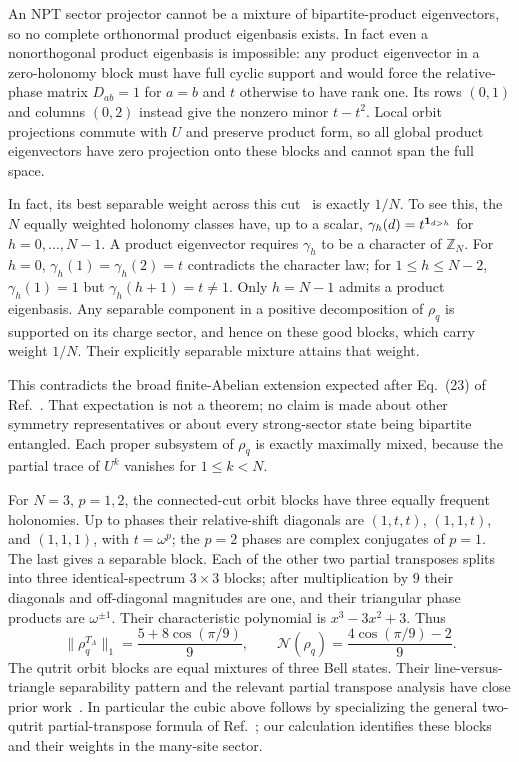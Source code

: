 \documentclass[aps,prl,reprint,nofootinbib]{revtex4-2}
\begin{document}
An NPT sector projector cannot be a mixture of bipartite-product
eigenvectors, so no complete orthonormal product eigenbasis exists. In
fact even a nonorthogonal product eigenbasis is impossible: any product
eigenvector in a zero-holonomy block must have full cyclic support and
would force the relative-phase matrix $D_{ab}=1$ for $a=b$ and $t$
otherwise to have rank one. Its rows $(0,1)$ and columns $(0,2)$ instead
give the nonzero minor $t-t^2$. Local orbit projections commute with $U$
and preserve product form, so all global product eigenvectors have zero
projection onto these blocks and cannot span the full space.

In fact, its best separable weight across this cut~\cite{Lewenstein} is
exactly $1/N$. To see this, the $N$ equally weighted holonomy classes have,
up to a scalar, $\gamma_h(d)=t^{{\bf1}_{d>h}}$ for $h=0,\ldots,N-1$.
A product eigenvector requires $\gamma_h$ to be a character of $\mathbb Z_N$.
For $h=0$, $\gamma_h(1)=\gamma_h(2)=t$ contradicts the character law;
for $1\le h\le N-2$, $\gamma_h(1)=1$ but $\gamma_h(h+1)=t\ne1$.
Only $h=N-1$ admits a product eigenbasis. Any separable component in a
positive decomposition of $\rho_q$ is supported on its charge sector,
and hence on these good blocks, which carry weight $1/N$. Their explicitly
separable mixture attains that weight.

This contradicts the broad finite-Abelian extension expected after
Eq.~(23) of Ref.~\cite{LCW}. That expectation is not a theorem; no claim
is made about other symmetry representatives or about every strong-sector
state being bipartite entangled. Each proper subsystem of $\rho_q$ is
exactly maximally mixed, because the partial trace of $U^k$ vanishes for
$1\le k<N$.

For $N=3$, $p=1,2$, the connected-cut orbit blocks have three equally
frequent holonomies. Up to phases their relative-shift diagonals are
$(1,t,t)$, $(1,1,t)$, and $(1,1,1)$, with $t=\omega^p$; the $p=2$
phases are complex conjugates of $p=1$. The last gives a separable block.
Each of the other two partial transposes splits into
three identical-spectrum $3\times3$ blocks; after multiplication by $9$
their diagonals and off-diagonal magnitudes are one, and their triangular
phase products are $\omega^{\pm1}$. Their characteristic polynomial is
$x^3-3x^2+3$. Thus
\begin{equation}
 \|\rho_q^{T_A}\|_1=\frac{5+8\cos(\pi/9)}9,
 \qquad
 \mathcal N(\rho_q)=\frac{4\cos(\pi/9)-2}{9}.
 \label{Z3norm}
\end{equation}
The qutrit orbit blocks are equal mixtures of three Bell states. Their
line-versus-triangle separability pattern and the relevant partial
transpose analysis have close prior work~\cite{Baumgartner,Derkacz}.
In particular the cubic above follows by specializing the general
two-qutrit partial-transpose formula of Ref.~\cite{Baumgartner}; our
calculation identifies these blocks and their weights in the many-site
sector.
\end{document}
